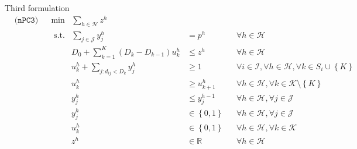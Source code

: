 \documentclass[utf8,aspectratio=169,ngerman,english]{beamer}
\newcommand{\nPCE}{\hyperref[eq:nPCE]{\texttt{(nPC3)}}}
\begin{document}
\begin{frame}{Third formulation}
    \vspace{-1.2cm}
    \begin{subequations}\label{eq:nPCE}
        \begin{align}
             & \nPCE &  & \min         & \sum_{h \in \mathcal H}    z^h           &                               &  & \label{eq:nEpCP-obj}                                                                                                        \\
             &       &  & \text{ s.t.} & \sum_{j \in \mathcal J}    y_{j}^h       & =      p^h                    &  & \forall h \in \mathcal{H}                                                                         \label{eq:nEpCP-faciltiy} \\[-4mm]
             &       &  &              & D_0 + \sum_{k=1}^{K}(D_k-D_{k-1})u^{h}_k & \leq   z^h                    &  & \forall h \in \mathcal{H}                                                                         \label{eq:nEpCP-rpush}    \\[-2mm]
             &       &  &              & u^{h}_k + \sum_{j:d_{ij}<D_k} y_{j}^h    & \geq   1                      &  & \forall i \in \mathcal{I}, \forall h \in \mathcal H, \forall k \in S_i \cup \left \{K \right \}   \label{eq:nEpCP-upush}    \\[-1mm]
             &       &  &              & u^{h}_k                                  & \geq   u_{k+1}^h              &  & \forall h \in \mathcal{H}, \forall k \in \mathcal{K} \setminus \left \{K \right \}                \label{eq:nEpCP-unest}    \\
             &       &  &              & y_{j}^h                                  & \leq   y_{j}^{h-1}            &  & \forall h \in \mathcal{H}, \forall j \in \mathcal{J}                                              \label{eq:nEpCP-nesting}  \\[-1mm]
             &       &  &              & y_{j}^h                                  & \in    \left \{0, 1 \right \} &  & \forall h \in \mathcal{H}, \forall j \in \mathcal{J}                                              \label{eq:nEpCP-ybin}     \\[-1mm]
             &       &  &              & u^{h}_k                                  & \in    \left \{0, 1 \right \} &  & \forall h \in \mathcal{H}, \forall k \in \mathcal{K}                                              \label{eq:nEpCP-ubin}     \\[-1mm]
             &       &  &              & z^h                                      & \in    \mathbb{R}             &  & \forall h \in \mathcal{H}                                                                         \label{eq:nEpCP-Rreal}
        \end{align}
    \end{subequations}
\end{frame}
\end{document}
